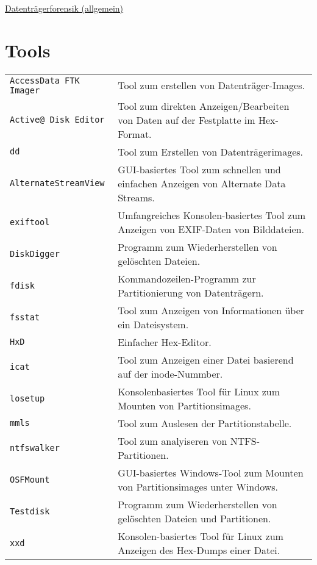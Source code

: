 \raggedright
\footnotesize
\begin{multicols}{3}	
	\setlength{\premulticols}{1pt}
	\setlength{\postmulticols}{1pt}
	\setlength{\multicolsep}{1pt}
	\setlength{\columnsep}{2pt}

\begin{center}
     \Large{\underline{Datenträgerforensik (allgemein)}} \\
\end{center}

\section{Tools}
\begin{tabular}{@{}p{\the\MyLen}
		@{}p{\linewidth-\the\MyLen}@{}}
	\texttt{AccessData FTK Imager} & Tool zum erstellen von Datenträger-Images.\\
	\texttt{Active@ Disk Editor} & Tool zum direkten Anzeigen/Bearbeiten von Daten auf der Festplatte im Hex-Format.\\
	\texttt{dd} & Tool zum Erstellen von Datenträgerimages.\\
	\texttt{Alternate\-Stream\-View} & GUI-basiertes Tool zum schnellen und einfachen Anzeigen von Alternate Data Streams.\\
	\texttt{exiftool} & Umfangreiches Konsolen-basiertes Tool zum Anzeigen von EXIF-Daten von Bilddateien.\\
	\texttt{DiskDigger} & Programm zum Wiederherstellen von gelöschten Dateien.\\
	\texttt{fdisk} & Kommandozeilen-Programm zur Partitionierung von Datenträgern.\\
	\texttt{fsstat} & Tool zum Anzeigen von Informationen über ein Dateisystem.\\
	\texttt{HxD} & Einfacher Hex-Editor.\\
	\texttt{icat} & Tool zum Anzeigen einer Datei basierend auf der inode-Nummber.\\
	\texttt{losetup} & Konsolenbasiertes Tool für Linux zum Mounten von Partitionsimages.\\
	\texttt{mmls} & Tool zum Auslesen der Partitionstabelle.\\
	\texttt{ntfswalker} & Tool zum analyiseren von NTFS-Partitionen.\\
	\texttt{OSFMount} & GUI-basiertes Windows-Tool zum Mounten von Partitionsimages unter Windows.\\
	\texttt{Testdisk} & Programm zum Wiederherstellen von gelöschten Dateien und Partitionen.\\
	\texttt{xxd} & Konsolen-basiertes Tool für Linux zum Anzeigen des Hex-Dumps einer Datei.\\
\end{tabular}
\end{multicols}